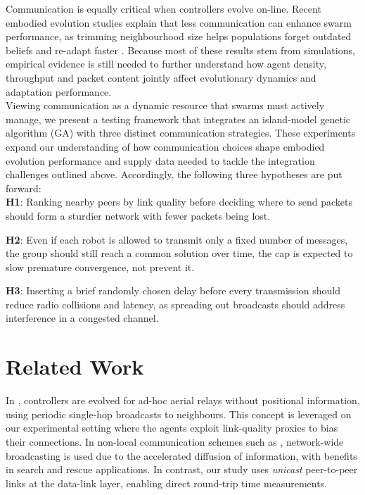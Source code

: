\documentclass[conference]{IEEEtran}
\begin{document}
Communication is equally critical when controllers evolve on-line. Recent embodied evolution studies explain that less communication can enhance swarm performance, as trimming neighbourhood size helps populations forget outdated beliefs and re-adapt faster \cite{hiraga_when_2023}\cite{ding_advancements_2023}. Because most of these results stem from simulations,  empirical evidence is still needed to further understand how agent density, throughput and packet content jointly affect evolutionary dynamics and adaptation performance.\\

Viewing communication as a dynamic resource that swarms must actively manage, we present a testing framework that integrates an island-model genetic algorithm (GA) with three distinct communication strategies. These experiments expand our understanding of how communication choices shape embodied evolution performance and supply data needed to tackle the integration challenges outlined above. Accordingly, the following three hypotheses are put forward:\\

\textbf{H1}: Ranking nearby peers by link quality before deciding where to send packets should form a sturdier network with fewer packets being lost.

\textbf{H2}: Even if each robot is allowed to transmit only a fixed number of messages, the group should still reach a common solution over time, the cap is expected to slow premature convergence, not prevent it.

\textbf{H3}: Inserting a brief randomly chosen delay before every transmission should reduce radio collisions and latency, as spreading out broadcasts should address interference in a congested channel.

\section{Related Work}

In \cite{hauert_evolved_2009}, controllers are evolved for ad-hoc aerial relays without positional information, using periodic single-hop broadcasts to neighbours. This concept is leveraged on our experimental setting where the agents exploit link-quality proxies to bias their connections. In non-local communication schemes such as \cite{perrin_decentralised_2012}, network-wide broadcasting is used due to the accelerated diffusion of information, with benefits in search and rescue applications. In contrast, our study uses \emph{unicast} peer-to-peer links at the data-link layer, enabling direct round-trip time measurements.\\
\end{document}
